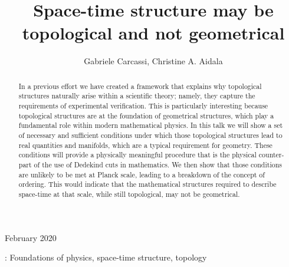 \documentclass[12pt]{iopart}
\begin{document}
\title{Space-time structure may be topological and not geometrical}

\author{Gabriele Carcassi, Christine A. Aidala}

\address{Physics Department, University of Michigan, 450 Church Street\\
	Ann Arbor, MI 48109-1040,
	United States}
\vspace{10pt}
\begin{indented}
\item[]February 2020
\end{indented}

\begin{abstract}
In a previous effort we have created a framework that explains why topological structures naturally arise within a scientific theory; namely, they capture the requirements of experimental verification. This is particularly interesting because topological structures are at the foundation of geometrical structures, which play a fundamental role within modern mathematical physics. In this talk we will show a set of necessary and sufficient conditions under which those topological structures lead to real quantities and manifolds, which are a typical requirement for geometry. These conditions will provide a physically meaningful procedure that is the physical counter-part of the use of Dedekind cuts in mathematics. We then show that those conditions are unlikely to be met at Planck scale, leading to a breakdown of the concept of ordering. This would indicate that the mathematical structures required to describe space-time at that scale, while still topological, may not be geometrical.
\end{abstract}

%
: Foundations of physics, space-time structure, topology

%
\submitto{\PS}
%
% 
%
\end{document}
